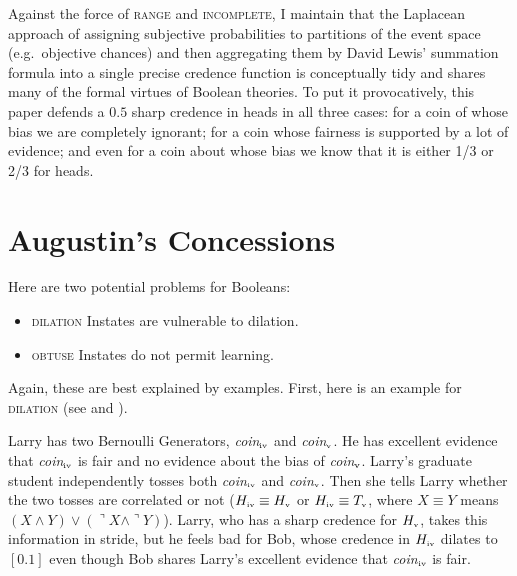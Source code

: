 \documentclass[11pt]{article}
\begin{document}
Against the force of \textsc{range} and \textsc{incomplete}, I
maintain that the Laplacean approach of assigning subjective
probabilities to partitions of the event space (e.g.\ objective
chances) and then aggregating them by David Lewis' summation formula
into a single precise credence function is conceptually tidy and
shares many of the formal virtues of Boolean theories. To put it
provocatively, this paper defends a $0.5$ sharp credence in heads in
all three cases: for a coin of whose bias we are completely ignorant;
for a coin whose fairness is supported by a lot of evidence; and even
for a coin about whose bias we know that it is either 1/3 or 2/3 for
heads. 

\section{Augustin's Concessions}
\label{AugustinsConcessions}

Here are two potential problems for Booleans:

\begin{itemize}
\item \textsc{dilation} Instates are vulnerable to dilation.
\item \textsc{obtuse} Instates do not permit learning.
\end{itemize}

Again, these are best explained by examples. First, here is an example
for \textsc{dilation} (see  and
).

\begin{quotex}
  \label{ex:dilation} Larry has two Bernoulli
  Generators, \textit{coin}$_{\mbox{\tiny{iv}}}$ and
  \textit{coin}$_{\mbox{\tiny{v}}}$. He has excellent evidence that
  \textit{coin}$_{\mbox{\tiny{iv}}}$ is fair and no evidence about the
  bias of \textit{coin}$_{\mbox{\tiny{v}}}$. Larry's graduate student
  independently tosses both \textit{coin}$_{\mbox{\tiny{iv}}}$ and
  \textit{coin}$_{\mbox{\tiny{v}}}$. Then she tells Larry whether the
  two tosses are correlated or not
  ($H_{\mbox{\tiny{iv}}}\equiv{}H_{\mbox{\tiny{v}}}$ or
  $H_{\mbox{\tiny{iv}}}\equiv{}T_{\mbox{\tiny{v}}}$, where
  $X\equiv{}Y$ means
  $(X\wedge{}Y)\vee(\urcorner{}X\wedge\urcorner{}Y)$). Larry, who has
  a sharp credence for $H_{\mbox{\tiny{v}}}$, takes this information
  in stride, but he feels bad for Bob, whose credence in
  $H_{\mbox{\tiny{iv}}}$ dilates to $[0.1]$ even though Bob shares
  Larry's excellent evidence that \textit{coin}$_{\mbox{\tiny{iv}}}$
  is fair.
\end{quotex}
\end{document}
